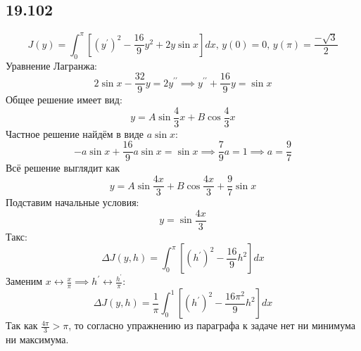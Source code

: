 \documentclass[12pt]{article}
\begin{document}
\subsection*{19.102}
\[
    J(y) = \int_{0}^{\pi} \left[ (y^{\prime})^2 - \frac{16}{9} y^2 + 2y \sin x \right] dx, \, y(0) = 0, \, y(\pi) = \frac{-\sqrt{3} }{2} 
\]
Уравнение Лагранжа: 
\[
    2\sin x - \frac{32}{9} y = 2y^{\prime\prime} \implies 
    y^{\prime\prime} + \frac{16}{9} y = \sin x
\]
Общее решение имеет вид: 
\[
    y = A \sin \frac{4}{3} x + B \cos \frac{4}{3} x
\]
Частное решение найдём в виде $a \sin x$: 
\[
    -a \sin x + \frac{16}{9} a \sin x = \sin x \implies 
    \frac{7}{9} a = 1 \implies a = \frac{9}{7}
\]
Всё решение выглядит как 
\[
    y = A \sin \frac{4x}{3} + B \cos \frac{4x}{3} + \frac{9}{7} \sin x
\]
Подставим начальные условия: 
\[
    y = \sin \frac{4x}{3}
\]
Такс: 
\[
    \Delta J(y, h) = 
    \int_{0}^{\pi} \left[ (h^{\prime})^2 - \frac{16}{9} h^2 \right] dx
\]
Заменим $x \leftrightarrow \frac{x}{\pi} \implies h^{\prime} \leftrightarrow \frac{h^{\prime}}{\pi}$: 
\[
    \Delta J(y, h) = \frac{1}{\pi} \int_{0}^{1} \left[ (h^{\prime})^2 - \frac{16 \pi^2}{9} h^2  \right]  dx
\] 
Так как $\frac{4\pi}{3} > \pi$, то согласно упражнению из параграфа к задаче нет ни минимума ни максимума. 
\end{document}
